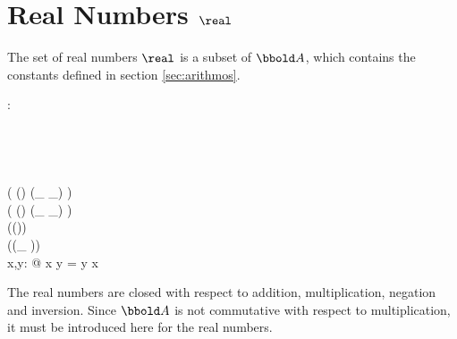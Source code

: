 \documentclass[12pt]{article}
\begin{document}
\section{Real Numbers $\real$}
\label{sec:real-numbers}
The set of real numbers $\real$ is a subset of $\arithmos$, which
contains the constants defined in section \ref{sec:arithmos}.
%
\begin{axdef}
  \real : \power \arithmos\\
  \where
  \azero \in \real\\
  \aone \in \real\\
  \atwo \in \real\\
  \aten \in \real\\
  \ran ( (\real \cross \real) \dres (\_ \aplus \_) ) \subset \real\\
  \ran ( (\real \cross \real) \dres (\_ \amult \_) ) \subset \real\\
  \ran (\real \dres (\aneg ))  \subset \real\\
  \ran (\real \dres (\_ \ainv ))  \subset \real\\
  \forall x,y: \real @ x \amult y = y \amult x \\
\end{axdef}

The real numbers are closed with respect to addition, multiplication,
negation and inversion. Since $\arithmos$ is not commutative with
respect to multiplication, it must be introduced here for the real
numbers. 
\end{document}
